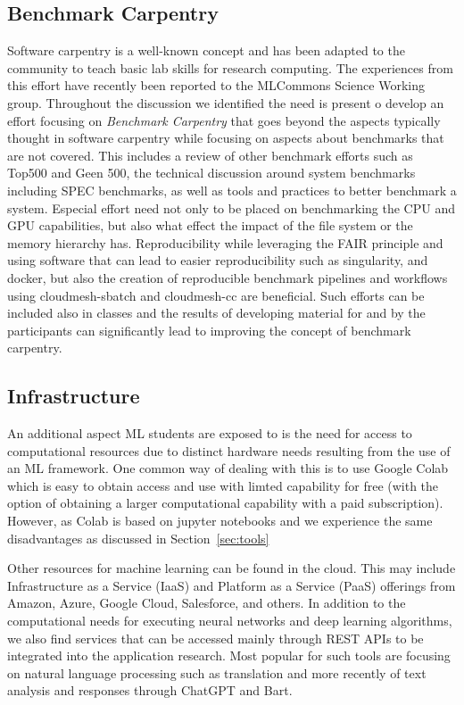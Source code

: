 \documentclass[utf8]{FrontiersinVancouver} %
\begin{document}
\subsection{Benchmark Carpentry}

Software carpentry \citep{software-carpentry} is a well-known concept
and has been adapted to the community to teach basic lab skills for
research computing.  The experiences from this effort have recently
been reported to the MLCommons Science Working group. Throughout
the discussion we identified the need is present o develop an effort
focusing on {\em Benchmark Carpentry} that goes beyond the aspects
typically thought in software carpentry while focusing on aspects
about benchmarks that are not covered. This includes a review of other
benchmark efforts such as Top500 and Geen 500, the technical
discussion around system benchmarks including SPEC benchmarks, as
well as tools and practices to better benchmark a system. Especial
effort need not only to be placed on benchmarking the CPU and GPU
capabilities, but also what effect the impact of the file system or
the memory hierarchy has. Reproducibility while leveraging the FAIR
principle and using software that can lead to easier reproducibility
such as singularity, and docker, but also the creation of reproducible
benchmark pipelines and workflows using cloudmesh-sbatch and
cloudmesh-cc are beneficial. Such efforts can be included also in
classes and the results of developing material for and by the
participants can significantly lead to improving the concept of
benchmark carpentry.

\subsection{Infrastructure}

An additional aspect ML students are exposed to is the need for access
to computational resources due to distinct hardware needs resulting from
the use of an ML framework. One common way of dealing with
this is to use Google Colab which is easy to obtain access and use
with limted capability for free (with the option of obtaining a larger
computational capability with a paid subscription).  However, as Colab is
based on jupyter notebooks and we experience the same disadvantages as discussed in
Section~\ref{sec:tools}

Other resources for machine learning can be found in the cloud. This
may include Infrastructure as a Service (IaaS) and Platform as a Service (PaaS) offerings from Amazon, Azure, Google Cloud,
Salesforce, and others.  In addition to the computational needs for
executing neural networks and deep learning algorithms, we also find
services that can be accessed mainly through REST APIs to be
integrated into the application research. Most popular for such tools
are focusing on natural language processing such as translation and
more recently of text analysis and responses through ChatGPT and Bart.
\end{document}
